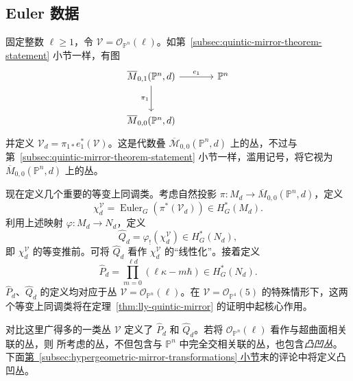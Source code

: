 \subsection{Euler 数据}\label{subsec:lly-euler-data}
固定整数 $\ell\ge1$，令 $\mathcal V=\mathcal O_{\mathbb P^n}(\ell)$。如第~\ref{subsec:quintic-mirror-theorem-statement} 小节一样，有图
\begin{equation}\label{eq:euler-data-universal-curve}
\begin{tikzcd}[column sep=large,row sep=large]
\overline M_{0,1}(\mathbb P^n,d)\arrow[r,"e_1"]\arrow[d,"\pi_1"']&\mathbb P^n\\
\overline M_{0,0}(\mathbb P^n,d)&
\end{tikzcd}
\end{equation}
并定义 $\mathcal V_d=\pi_{1*}e_1^*(\mathcal V)$。这是代数叠 $\overline{\mathcal M}_{0,0}(\mathbb P^n,d)$ 上的丛，不过与第~\ref{subsec:quintic-mirror-theorem-statement} 小节一样，滥用记号，将它视为 $\overline M_{0,0}(\mathbb P^n,d)$ 上的丛。

现在定义几个重要的等变上同调类。考虑自然投影 $\pi:M_d\to\overline M_{0,0}(\mathbb P^n,d)$，定义
\[
\chi_d^{\mathcal V}=\operatorname{Euler}_G(\pi^*(\mathcal V_d))\in H_G^*(M_d).
\]
利用上述映射 $\varphi:M_d\to N_d$，定义
\begin{equation}\label{eq:geometric-euler-data}
\widehat Q_d=\varphi_!(\chi_d^{\mathcal V})\in H_G^*(N_d),
\end{equation}
即 $\chi_d^{\mathcal V}$ 的等变推前。可将 $\widehat Q_d$ 看作 $\chi_d^{\mathcal V}$ 的“线性化”。接着定义
\begin{equation}\label{eq:hypergeometric-euler-data}
\widehat P_d=\prod_{m=0}^{\ell d}(\ell\kappa-m\hbar)\in H_G^*(N_d).
\end{equation}
$\widehat P_d$、$\widehat Q_d$ 的定义均对应于丛 $\mathcal V=\mathcal O_{\mathbb P^n}(\ell)$。在 $\mathcal V=\mathcal O_{\mathbb P^4}(5)$ 的特殊情形下，这两个等变上同调类将在定理~\ref{thm:lly-quintic-mirror} 的证明中起核心作用。

 对比这里广得多的一类丛 $\mathcal V$ 定义了 $\widehat P_d$ 和 $\widehat Q_d$。若将 $\mathcal O_{\mathbb P^n}(\ell)$ 看作与超曲面相关联的丛，则  所考虑的丛，不但包含与 $\mathbb P^n$ 中完全交相关联的丛，也包含\emph{凸凹丛}。下面\hyperref[subsec:hypergeometric-mirror-transformations]{第~\ref*{subsec:hypergeometric-mirror-transformations} 小节}末的评论中将定义凸凹丛。

